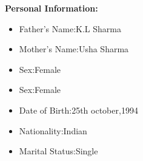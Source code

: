 \documentclass[10pt,a4paper]{article}
\begin{document}
\begin{flushleft}
		 \textbf{Personal Information:}\\
		 
		 \begin{itemize}
		 	\item Father's Name:K.L Sharma\\
		 	\item Mother's Name:Usha Sharma\\
		 	\item Sex:Female\\
		 	\item Sex:Female\\
		 	\item Date of Birth:25th october,1994\\
		 	\item Nationality:Indian\\
		 	\item Marital Status:Single\\
		 \end{itemize}
	
\end{flushleft}

 
\end{document}
